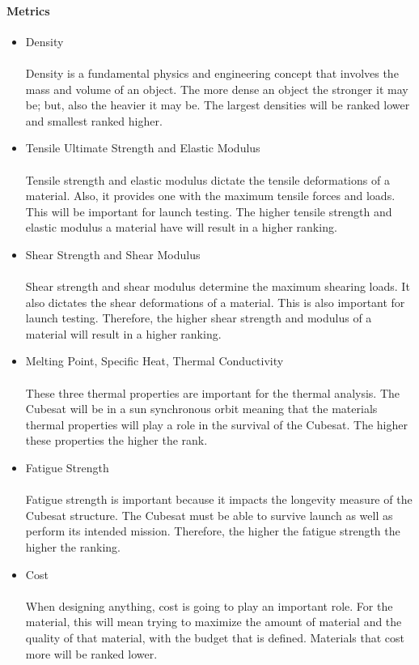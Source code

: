 \documentclass{ece}
\begin{document}
\paragraph{Metrics}
\begin{itemize}
\item{Density}\\
\\
Density is a fundamental physics and engineering concept that involves the mass and volume of an object. The more dense an object the stronger it may be; but, also the heavier it may be. The largest densities will be ranked lower and smallest ranked higher. 
\item{Tensile Ultimate Strength and Elastic Modulus}\\
\\
Tensile strength and elastic modulus dictate the tensile deformations of a material. Also, it provides one with the maximum tensile forces and loads. This will be important for launch testing. The higher tensile strength and elastic modulus a material have will result in a higher ranking.
\item{Shear Strength and Shear Modulus}\\
\\
Shear strength and shear modulus determine the maximum shearing loads. It also dictates the shear deformations of a material. This is also important for launch testing. Therefore, the higher shear strength and modulus of a material will result in a higher ranking. 
\item{Melting Point, Specific Heat, Thermal Conductivity}\\
\\
These three thermal properties are important for the thermal analysis. The Cubesat will be in a sun synchronous orbit meaning that the materials thermal properties will play a role in the survival of the Cubesat. The higher these properties the higher the rank. 
\item{Fatigue Strength}\\
\\
Fatigue strength is important because it impacts the longevity measure of the Cubesat structure. The Cubesat must be able to survive launch as well as perform its intended mission. Therefore, the higher the fatigue strength the higher the ranking. 
\item{Cost}\\
\\
When designing anything, cost is going to play an important role. For the material, this will mean trying to maximize the amount of material and the quality of that material, with the budget that is defined. Materials that cost more will be ranked lower. 
\end{itemize}
\end{document}

